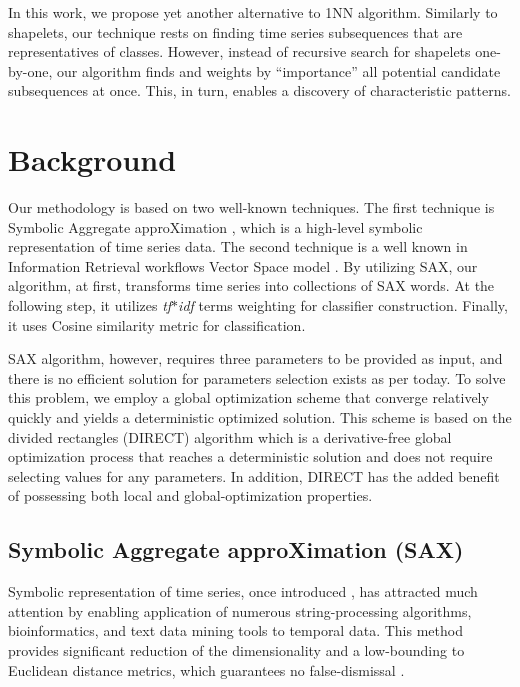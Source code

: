 \documentclass{llncs}
\begin{document}
In this work, we propose yet another alternative to 1NN algorithm. Similarly to shapelets, our
technique rests on finding time series subsequences that are representatives of classes. However,
instead of recursive search for shapelets one-by-one, our algorithm finds and weights by
``importance'' all potential candidate subsequences at once. This, in turn, enables a discovery of
characteristic patterns.

\section{Background}
Our methodology is based on two well-known techniques. The first technique is Symbolic Aggregate
approXimation \cite{sax}, which is a high-level symbolic representation of time series
data. The second technique is a well known in Information Retrieval workflows Vector Space 
model \cite{salton}. By utilizing SAX, our algorithm, at first, transforms time series into collections of 
SAX words. At the following step, it utilizes \textit{tf$\ast$idf} terms weighting for classifier 
construction. Finally, it uses Cosine similarity metric for classification.

SAX algorithm, however, requires three parameters to be provided as input, and there is no efficient 
solution for parameters selection exists as per today. To solve this problem, we employ a global 
optimization scheme that converge relatively quickly and yields a deterministic optimized solution. 
This scheme is based on the divided rectangles (DIRECT) algorithm \cite{direct} which is
a derivative-free global optimization process that reaches a deterministic solution and does
not require  selecting values for any parameters. In addition, DIRECT has the added benefit of
possessing both local and global-optimization properties. 

\subsection{Symbolic Aggregate approXimation (SAX)}
Symbolic representation of time series, once introduced \cite{sax}, has attracted much attention by
enabling application of numerous string-processing algorithms, bioinformatics, and text data mining 
tools to temporal data. This method provides significant reduction of the dimensionality and
a low-bounding to Euclidean distance metrics, which guarantees no false-dismissal  \cite{hot_sax}.
\end{document}
